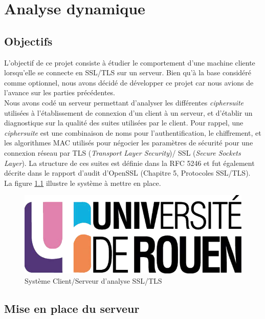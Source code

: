 \chapter{Analyse dynamique}

\section{Objectifs}
L'objectif de ce projet consiste à étudier le comportement d'une machine cliente lorsqu'elle se connecte en SSL/TLS sur un serveur. Bien qu'à la base considéré comme optionnel, nous avons décidé de développer ce projet car nous avions de l'avance sur les parties précédentes. \\

Nous avons codé un serveur permettant d'analyser les différentes \textit{ciphersuite} utilisées à l'établissement de connexion d'un client à un serveur, et d'établir un diagnostique sur la qualité des suites utilisées par le client. Pour rappel, une \textit{ciphersuite} est une combinaison de noms pour l'authentification, le chiffrement, et les algorithmes MAC utilisés pour négocier les paramètres de sécurité pour une connexion réseau par TLS (\textit{Transport Layer Security})/ SSL (\textit{Secure Sockets Layer}). La structure de ces suites est définie dans la RFC 5246 \cite{rfc5246} et fut également décrite dans le rapport d'audit d'OpenSSL (Chapitre 5, Protocoles SSL/TLS).\\



La figure \ref{systServer} illustre le système à mettre en place.
\begin{figure}[H]
	\begin{center}
	\includegraphics[scale=0.2]{images/logo_univ.png}
	\end{center}
\caption{Système Client/Serveur d'analyse SSL/TLS}
\label{systServer}
\end{figure}



\section{Mise en place du serveur}

